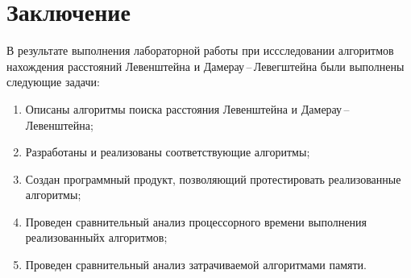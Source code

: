 \chapter*{Заключение}

В результате выполнения лабораторной работы при иссследовании алгоритмов нахождения расстояний Левенштейна и Дамерау\,--\,Левегштейна были выполнены следующие задачи:
\begin{enumerate}
    \item Описаны алгоритмы поиска расстояния Левенштейна и Дамерау\,--\,Левенштейна;
    \item Разработаны и реализованы соответствующие алгоритмы;
    \item Создан программный продукт, позволяющий протестировать реализованные алгоритмы;
    \item Проведен сравнительный анализ процессорного времени выполнения реализованныйх алгоритмов;
    \item Проведен сравнительный анализ затрачиваемой алгоритмами памяти.
\end{enumerate}